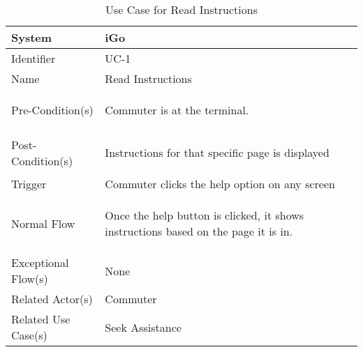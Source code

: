 
\begin{table}[ht]
    \centering
    \begin{tabular}{|l|p{11cm}|}
         \hline
         System             & iGo\\
         \hline
         Identifier         & UC-1 \\
         \hline
         Name               & Read Instructions \\
         \hline
         Pre-Condition(s)   & 
         \begin{enumerate*}[itemjoin=\newline]
             \item Commuter is at the terminal.
         \end{enumerate*} \\
         \hline
         Post-Condition(s)  & 
         \begin{enumerate*}[itemjoin=\newline]
             \item Instructions for that specific page is displayed 
         \end{enumerate*} \\
         \hline
         Trigger            & Commuter clicks the help option on any screen \\
         \hline
         Normal Flow        & 
         \begin{enumerate*}[itemjoin=\newline]
             \item Once the help button is clicked, it shows instructions based on the page it is in.
         \end{enumerate*} \\
         \hline
         Exceptional Flow(s)& None\\
         \hline
         Related Actor(s)   & Commuter \\
         \hline
         Related Use Case(s)& Seek Assistance\\
         \hline
    \end{tabular}
    \caption{Use Case for Read Instructions}
    \label{tab:UC_ReadInstructions}
\end{table}

